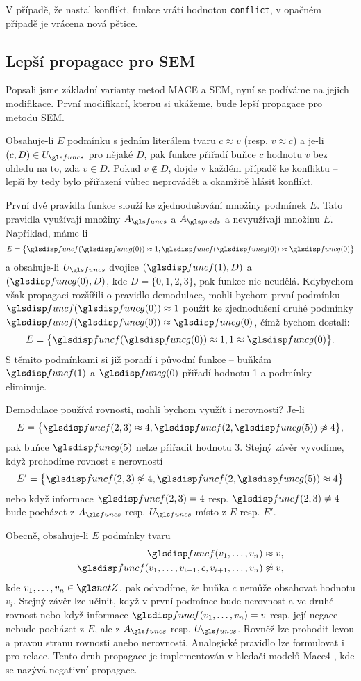 V případě, že nastal konflikt, funkce
 vrátí hodnotou \texttt{conflict},
v opačném případě je vrácena nová pětice.

\subsection{Lepší propagace pro SEM}

Popsali jsme základní varianty metod MACE a SEM,
nyní se podíváme na jejich modifikace.
První modifikací, kterou si ukážeme, bude lepší
propagace pro metodu SEM.

Obsahuje-li $E$ podmínku s jedním literálem tvaru $c \approx v$
(resp. $v \approx c$) a je-li $(c, D) \in U_\funcs$ pro nějaké $D$,
pak funkce  přiřadí buňce $c$ hodnotu $v$
bez ohledu na to, zda $v \in D$. Pokud $v \notin D$, dojde
v každém případě ke konfliktu -- lepší by tedy bylo přiřazení vůbec
neprovádět a okamžitě hlásit konflikt.

První dvě pravidla funkce  slouží
ke zjednodušování množiny podmínek $E$.
Tato pravidla využívají množiny $A_\funcs$ a $A_\preds$
a nevyužívají množinu $E$.
Například, máme-li
\[
  E = \bigl\{ \func(\funcG(0)) \approx 1,
              \func(\funcG(0)) \approx \funcG(0) \bigr\}
\]
a obsahuje-li $U_\funcs$ dvojice $(\func(1), D)$
a $(\funcG(0), D)$, kde $D = \{ 0, 1, 2, 3 \}$, pak funkce
 nic neudělá.
Kdybychom však propagaci rozšířili o pravidlo demodulace,
mohli bychom první podmínku $\func(\funcG(0)) \approx 1$
použít ke zjednodušení druhé podmínky $\func(\funcG(0)) \approx \funcG(0)$,
čímž bychom dostali:
\[
  E = \bigl\{ \func(\funcG(0)) \approx 1, 1 \approx \funcG(0) \bigr\}.
\]
S těmito podmínkami si již poradí i původní funkce 
-- buňkám $\func(1)$ a $\funcG(0)$ přiřadí hodnotu 1 a podmínky eliminuje.

Demodulace používá rovnosti, mohli bychom využít i nerovnosti?
Je-li
\[
  E = \bigl\{ \func(2, 3) \approx 4,
              \func(2, \funcG(5)) \not\approx 4 \bigr\},
\]
pak buňce $\funcG(5)$ nelze přiřadit hodnotu 3. Stejný
závěr vyvodíme, když prohodíme rovnost s nerovností
\[
  E' = \bigl\{ \func(2, 3) \not\approx 4,
              \func(2, \funcG(5)) \approx 4 \bigr\}
\]
nebo když informace $\func(2, 3) = 4$ resp. $\func(2, 3) \neq 4$  bude
pocházet z $A_\funcs$ resp. $U_\funcs$ místo z $E$ resp. $E'$.

Obecně, obsahuje-li $E$ podmínky tvaru
\begin{align*}
\func(v_1 \comdots v_n) &\approx v, \\
\func(v_1 \comdots v_{i-1}, c, v_{i+1} \comdots  v_n) &\not\approx v,
\end{align*}
kde $v_1 \comdots v_n \in \natZ$, pak odvodíme, že buňka $c$ nemůže
obsahovat hodnotu $v_i$. Stejný závěr lze učinit, když
v první podmínce bude nerovnost a ve druhé rovnost
nebo když informace $\func(v_1 \comdots v_n) = v$ resp. její
negace nebude pocházet z $E$, ale z $A_\funcs$ resp. $U_\funcs$.
Rovněž lze prohodit levou a pravou stranu rovnosti anebo
nerovnosti. Analogické pravidlo lze formulovat i pro relace.
Tento druh propagace je implementován v hledači modelů Mace4
\cite{mccune03mace4}, kde se nazývá negativní propagace.

